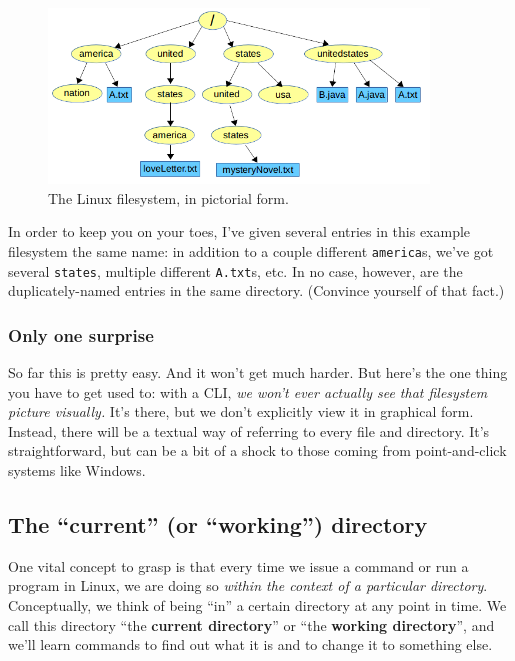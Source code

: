 \begin{figure}[ht]
\centering
\includegraphics[width=0.9\textwidth]{tree.png}  %
\caption{The Linux filesystem, in pictorial form.}
\label{fig:tree}
\end{figure}

In order to keep you on your toes, I've given several entries in this example
filesystem the same name: in addition to a couple different \texttt{america}s,
we've got several \texttt{states}, multiple different \texttt{A.txt}s, etc. In
no case, however, are the duplicately-named entries in the same directory.
(Convince yourself of that fact.)

\subsubsection{Only one surprise}

So far this is pretty easy. And it won't get much harder. But here's the one
thing you have to get used to: with a CLI, \textit{we won't ever actually see
that filesystem picture visually.} It's there, but we don't explicitly view it
in graphical form. Instead, there will be a textual way of referring to every
file and directory. It's straightforward, but can be a bit of a shock to those
coming from point-and-click systems like Windows.

\subsection{The ``current'' (or ``working'') directory}

One vital concept to grasp is that every time we issue a command or run a
program in Linux, we are doing so \textit{within the context of a particular
directory}. Conceptually, we think of being ``in'' a certain directory at any
point in time. We call this directory ``the \textbf{current directory}'' or
``the \textbf{working directory}'', and we'll learn commands to find out what
it is and to change it to something else.


